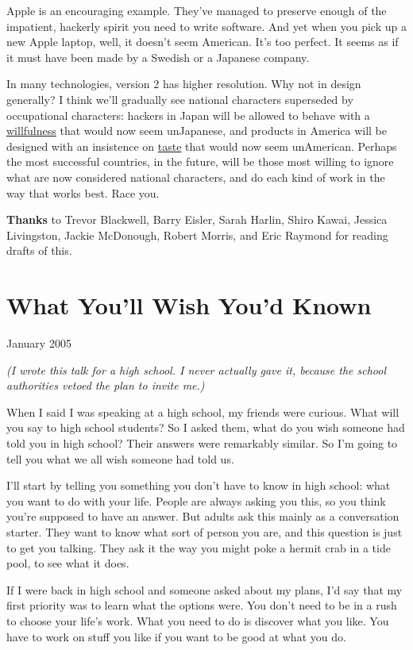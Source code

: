 \documentclass[12pt]{book}
\begin{document}
Apple is an encouraging example. They've managed to preserve enough of
the impatient, hackerly spirit you need to write software. And yet when
you pick up a new Apple laptop, well, it doesn't seem American. It's too
perfect. It seems as if it must have been made by a Swedish or a
Japanese company.

In many technologies, version 2 has higher resolution. Why not in design
generally? I think we'll gradually see national characters superseded by
occupational characters: hackers in Japan will be allowed to behave with
a \href{gba.html}{willfulness} that would now seem unJapanese, and
products in America will be designed with an insistence on
\href{taste.html}{taste} that would now seem unAmerican. Perhaps the
most successful countries, in the future, will be those most willing to
ignore what are now considered national characters, and do each kind of
work in the way that works best. Race you.


\textbf{Thanks} to Trevor Blackwell, Barry Eisler, Sarah Harlin, Shiro
Kawai, Jessica Livingston, Jackie McDonough, Robert Morris, and Eric
Raymond for reading drafts of this.
\chapter{What You'll Wish You'd Known}

January 2005

\emph{(I wrote this talk for a high school. I never actually gave it,
because the school authorities vetoed the plan to invite me.)}

When I said I was speaking at a high school, my friends were curious.
What will you say to high school students? So I asked them, what do you
wish someone had told you in high school? Their answers were remarkably
similar. So I'm going to tell you what we all wish someone had told us.

I'll start by telling you something you don't have to know in high
school: what you want to do with your life. People are always asking you
this, so you think you're supposed to have an answer. But adults ask
this mainly as a conversation starter. They want to know what sort of
person you are, and this question is just to get you talking. They ask
it the way you might poke a hermit crab in a tide pool, to see what it
does.

If I were back in high school and someone asked about my plans, I'd say
that my first priority was to learn what the options were. You don't
need to be in a rush to choose your life's work. What you need to do is
discover what you like. You have to work on stuff you like if you want
to be good at what you do.
\end{document}
